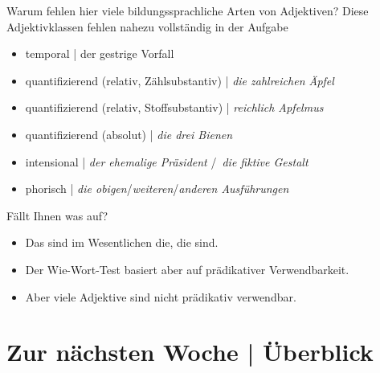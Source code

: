\begin{frame}
  {Warum fehlen hier viele bildungssprachliche Arten von Adjektiven?}
  \pause
  \small
  Diese Adjektivklassen fehlen nahezu vollständig in der Aufgabe
  \pause
  \begin{itemize}[<+->]
    \item \alert{temporal} | der \alert{gestrige} Vorfall
    \item \alert{quantifizierend} (relativ, Zählsubstantiv) | \textit{die \alert{zahlreichen} Äpfel}
    \item \alert{quantifizierend} (relativ, Stoffsubstantiv) | \textit{\alert{reichlich} Apfelmus}
    \item \alert{quantifizierend} (absolut) | \textit{die \alert{drei} Bienen}
    \item \alert{intensional} | \textit{der \alert{ehemalige} Präsident} \slash\ \textit{die \alert{fiktive} Gestalt}
    \item \alert{phorisch} | \textit{die \alert{obigen}}/\textit{\alert{weiteren}}/\textit{\alert{anderen} Ausführungen}
  \end{itemize}
  \pause
  \Halbzeile
  Fällt Ihnen was auf?
  \pause
  \begin{itemize}[<+->]
    \item Das sind im Wesentlichen die, die  sind.
    \item Der Wie-Wort-Test basiert aber auf prädikativer Verwendbarkeit.
    \item Aber viele Adjektive sind nicht prädikativ verwendbar. 
  \end{itemize}
\end{frame}

\ifdefined\TITLE
  \section{Zur nächsten Woche | Überblick}

